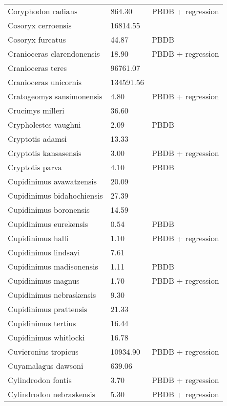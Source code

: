 \documentclass{article}
\begin{document}
\begin{center}
\begin{longtable}{p{} p{} p{}}
    Coryphodon radians & 864.30 & PBDB + regression \\ 
    Cosoryx cerroensis & 16814.55 & \cite{Tomiya2013} \\ 
    Cosoryx furcatus & 44.87 & PBDB \\ 
    Cranioceras clarendonensis & 18.90 & PBDB + regression \\ 
    Cranioceras teres & 96761.07 & \cite{Tomiya2013} \\ 
    Cranioceras unicornis & 134591.56 & \cite{Tomiya2013} \\ 
    Cratogeomys sansimonensis & 4.80 & PBDB + regression \\ 
    Crucimys milleri & 36.60 & \cite{Tomiya2013} \\ 
    Crypholestes vaughni & 2.09 & PBDB \\ 
    Cryptotis adamsi & 13.33 & \cite{Tomiya2013} \\ 
    Cryptotis kansasensis & 3.00 & PBDB + regression \\ 
    Cryptotis parva & 4.10 & PBDB \\ 
    Cupidinimus avawatzensis & 20.09 & \cite{Tomiya2013} \\ 
    Cupidinimus bidahochiensis & 27.39 & \cite{Tomiya2013} \\ 
    Cupidinimus boronensis & 14.59 & \cite{Tomiya2013} \\ 
    Cupidinimus eurekensis & 0.54 & PBDB \\ 
    Cupidinimus halli & 1.10 & PBDB + regression \\ 
    Cupidinimus lindsayi & 7.61 & \cite{Tomiya2013} \\ 
    Cupidinimus madisonensis & 1.11 & PBDB \\ 
    Cupidinimus magnus & 1.70 & PBDB + regression \\ 
    Cupidinimus nebraskensis & 9.30 & \cite{Tomiya2013} \\ 
    Cupidinimus prattensis & 21.33 & \cite{Tomiya2013} \\ 
    Cupidinimus tertius & 16.44 & \cite{Tomiya2013} \\ 
    Cupidinimus whitlocki & 16.78 & \cite{Tomiya2013} \\ 
    Cuvieronius tropicus & 10934.90 & PBDB + regression \\ 
    Cuyamalagus dawsoni & 639.06 & \cite{Tomiya2013} \\ 
    Cylindrodon fontis & 3.70 & PBDB + regression \\ 
    Cylindrodon nebraskensis & 5.30 & PBDB + regression \\ 

\end{longtable}
\end{center}
\end{document}
